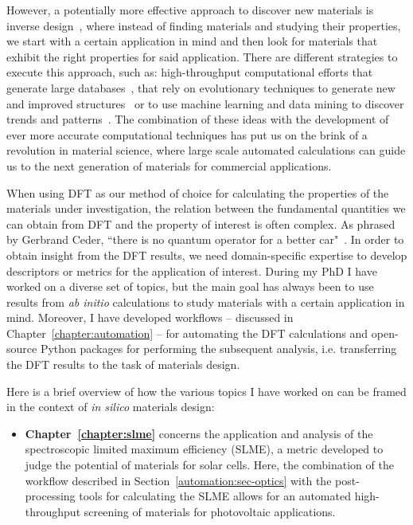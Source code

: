 \begin{refsection}
However, a potentially more effective approach to discover new materials is 
inverse design~\cite{Zunger2018}, where instead of finding materials and studying 
their properties, we start with a certain application in mind and then look for 
materials that exhibit the right properties for said application. There are 
different strategies to execute this approach, such as: high-throughput 
computational efforts that generate large databases~\cite{Curtarolo2013, Jain2011}, 
that rely on evolutionary techniques to generate new and improved 
structures~\cite{Oganov2018} or to use machine learning and data mining to discover 
trends and patterns~\cite{Draxl2019}. The combination of these ideas with the 
development of ever more accurate computational techniques has put us on the brink of a revolution in material science, where large scale automated calculations can guide us to the next generation of materials for commercial applications.

When using \gls{DFT} as our method of choice for calculating the properties of the materials under investigation, the relation between the fundamental quantities we can obtain from \gls{DFT} and the property of interest is often complex. As phrased by Gerbrand Ceder, ``there is no quantum operator for a better car"~\cite{Ceder2010}. In order to obtain insight from the \gls{DFT} results, we need domain-specific expertise to develop descriptors or metrics for the application of interest. During my PhD I have worked on a diverse set of topics, but the main goal has always been to use results from \textit{ab initio} calculations to study materials with a certain application in mind. Moreover, I have developed workflows -- discussed in Chapter~\ref{chapter:automation} -- for automating the \gls{DFT} calculations and open-source Python packages for performing the subsequent analysis, i.e. transferring the \gls{DFT} results to the task of materials design. 

Here is a brief overview of how the various topics I have worked on can be framed in the context of \textit{in silico} materials design:

\begin{itemize}[]

\item \textbf{Chapter~\ref{chapter:slme}} concerns the application and analysis of the spectroscopic limited maximum efficiency (\gls{SLME}), a metric developed to judge the potential of materials for solar cells. Here, the combination of the workflow described in Section~\ref{automation:sec-optics} with the post-processing tools for calculating the \gls{SLME} allows for an automated high-throughput screening of materials for photovoltaic applications.


\end{itemize}
\end{refsection}
